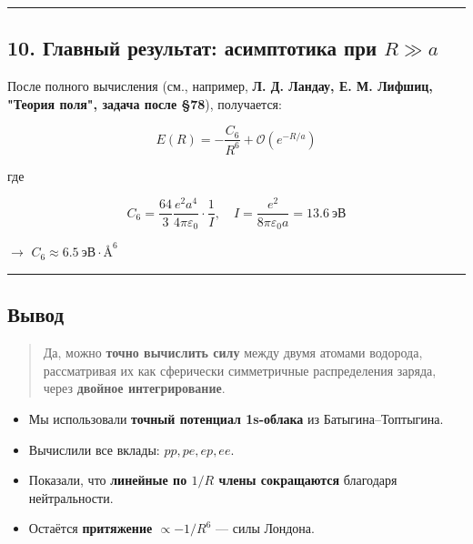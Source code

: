 \documentclass[11pt]{article}
\providecommand{\tightlist}{%
      \setlength{\itemsep}{0pt}\setlength{\parskip}{0pt}}
\begin{document}
\begin{center}\rule{0.5\linewidth}{\linethickness}\end{center}

\subsection{\texorpdfstring{10. Главный результат: асимптотика при
\(R \gg a\)}{10. Главный результат: асимптотика при R \textbackslash{}gg a}}\label{ux433ux43bux430ux432ux43dux44bux439-ux440ux435ux437ux443ux43bux44cux442ux430ux442-ux430ux441ux438ux43cux43fux442ux43eux442ux438ux43aux430-ux43fux440ux438-r-gg-a}

После полного вычисления (см., например, \textbf{Л. Д. Ландау, Е. М.
Лифшиц, "Теория поля", задача после §78}), получается:

\[
E(R) = -\frac{C_6}{R^6} + \mathcal{O}(e^{-R/a})
\]

где

\[
C_6 = \frac{64}{3} \frac{e^2 a^4}{4\pi\varepsilon_0} \cdot \frac{1}{I}, \quad I = \frac{e^2}{8\pi\varepsilon_0 a} = 13.6~\text{эВ}
\]

$\rightarrow$ \(C_6 \approx 6.5~\text{эВ} \cdot \text{Å}^6\)

\begin{center}\rule{0.5\linewidth}{\linethickness}\end{center}

\subsection{Вывод}\label{ux432ux44bux432ux43eux434}

\begin{quote}
Да, можно \textbf{точно вычислить силу} между двумя атомами водорода,
рассматривая их как сферически симметричные распределения заряда, через
\textbf{двойное интегрирование}.
\end{quote}

\begin{itemize}
\tightlist
\item
  Мы использовали \textbf{точный потенциал 1s-облака} из
  Батыгина--Топтыгина.
\item
  Вычислили все вклады: \(pp, pe, ep, ee\).
\item
  Показали, что \textbf{линейные по \(1/R\) члены сокращаются} благодаря
  нейтральности.
\item
  Остаётся \textbf{притяжение \(\propto -1/R^6\)} --- силы Лондона.
\end{itemize}
\end{document}
